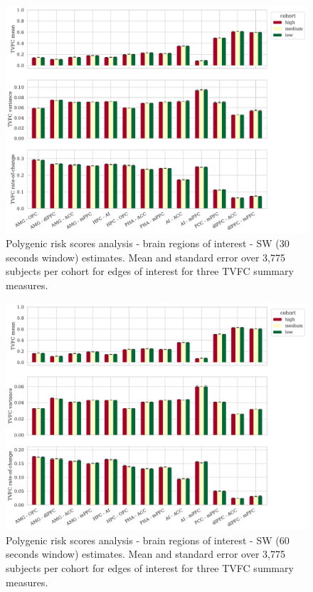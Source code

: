 \begin{figure}[h]
    \centering
    \includegraphics[width=\textwidth]{fig/ukbiobank/TVFC_predictions_summaries/pgs/cohort_comparison/ROI/correlation_all_TVFC_summary_measures_SW_30_edges_of_interest}
    \caption{
        Polygenic risk scores analysis - brain regions of interest - SW (30 seconds window) estimates.
        Mean and standard error over 3,775 subjects per cohort for edges of interest for three TVFC summary measures.
    }\label{fig:ukb-results-pgs-roi-cohort-comparison-edges-of-interest-sw-30}
\end{figure}


\begin{figure}[h]
    \centering
    \includegraphics[width=\textwidth]{fig/ukbiobank/TVFC_predictions_summaries/pgs/cohort_comparison/ROI/correlation_all_TVFC_summary_measures_SW_60_edges_of_interest}
    \caption{
        Polygenic risk scores analysis - brain regions of interest - SW (60 seconds window) estimates.
        Mean and standard error over 3,775 subjects per cohort for edges of interest for three TVFC summary measures.
    }\label{fig:ukb-results-pgs-roi-cohort-comparison-edges-of-interest-sw-60}
\end{figure}


